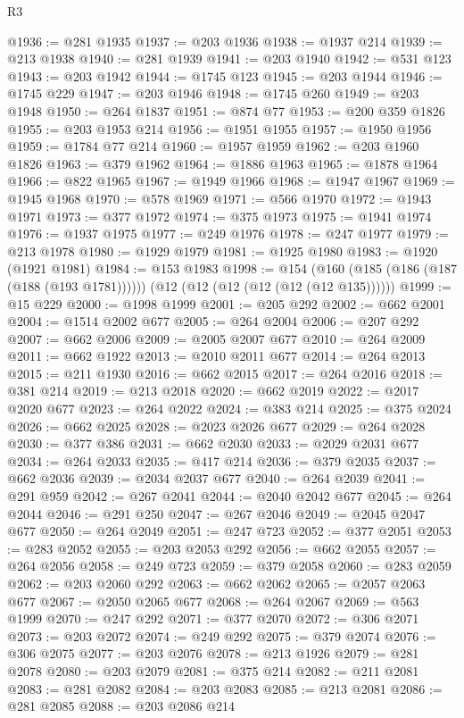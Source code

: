 \begin{lexlean}{R3}
\begin{coremodule}
@1936 := @281 @1935
@1937 := @203 @1936
@1938 := @1937 @214
@1939 := @213 @1938
@1940 := @281 @1939
@1941 := @203 @1940
@1942 := @531 @123
@1943 := @203 @1942
@1944 := @1745 @123
@1945 := @203 @1944
@1946 := @1745 @229
@1947 := @203 @1946
@1948 := @1745 @260
@1949 := @203 @1948
@1950 := @264 @1837
@1951 := @874 @77
@1953 := @200 @359 @1826
@1955 := @203 @1953 @214
@1956 := @1951 @1955
@1957 := @1950 @1956
@1959 := @1784 @77 @214
@1960 := @1957 @1959
@1962 := @203 @1960 @1826
@1963 := @379 @1962
@1964 := @1886 @1963
@1965 := @1878 @1964
@1966 := @822 @1965
@1967 := @1949 @1966
@1968 := @1947 @1967
@1969 := @1945 @1968
@1970 := @578 @1969
@1971 := @566 @1970
@1972 := @1943 @1971
@1973 := @377 @1972
@1974 := @375 @1973
@1975 := @1941 @1974
@1976 := @1937 @1975
@1977 := @249 @1976
@1978 := @247 @1977
@1979 := @213 @1978
@1980 := @1929 @1979
@1981 := @1925 @1980
@1983 := @1920 (@1921 @1981)
@1984 := @153 @1983
@1998 := @154
    (@160 (@185 (@186 (@187 (@188 (@193 @1781))))))
    (@12 (@12 (@12 (@12 (@12 (@12 @135))))))
@1999 := @15 @229
@2000 := @1998 @1999
@2001 := @205 @292
@2002 := @662 @2001
@2004 := @1514 @2002 @677
@2005 := @264 @2004
@2006 := @207 @292
@2007 := @662 @2006
@2009 := @2005 @2007 @677
@2010 := @264 @2009
@2011 := @662 @1922
@2013 := @2010 @2011 @677
@2014 := @264 @2013
@2015 := @211 @1930
@2016 := @662 @2015
@2017 := @264 @2016
@2018 := @381 @214
@2019 := @213 @2018
@2020 := @662 @2019
@2022 := @2017 @2020 @677
@2023 := @264 @2022
@2024 := @383 @214
@2025 := @375 @2024
@2026 := @662 @2025
@2028 := @2023 @2026 @677
@2029 := @264 @2028
@2030 := @377 @386
@2031 := @662 @2030
@2033 := @2029 @2031 @677
@2034 := @264 @2033
@2035 := @417 @214
@2036 := @379 @2035
@2037 := @662 @2036
@2039 := @2034 @2037 @677
@2040 := @264 @2039
@2041 := @291 @959
@2042 := @267 @2041
@2044 := @2040 @2042 @677
@2045 := @264 @2044
@2046 := @291 @250
@2047 := @267 @2046
@2049 := @2045 @2047 @677
@2050 := @264 @2049
@2051 := @247 @723
@2052 := @377 @2051
@2053 := @283 @2052
@2055 := @203 @2053 @292
@2056 := @662 @2055
@2057 := @264 @2056
@2058 := @249 @723
@2059 := @379 @2058
@2060 := @283 @2059
@2062 := @203 @2060 @292
@2063 := @662 @2062
@2065 := @2057 @2063 @677
@2067 := @2050 @2065 @677
@2068 := @264 @2067
@2069 := @563 @1999
@2070 := @247 @292
@2071 := @377 @2070
@2072 := @306 @2071
@2073 := @203 @2072
@2074 := @249 @292
@2075 := @379 @2074
@2076 := @306 @2075
@2077 := @203 @2076
@2078 := @213 @1926
@2079 := @281 @2078
@2080 := @203 @2079
@2081 := @375 @214
@2082 := @211 @2081
@2083 := @281 @2082
@2084 := @203 @2083
@2085 := @213 @2081
@2086 := @281 @2085
@2088 := @203 @2086 @214

\end{coremodule}
\end{lexlean}
